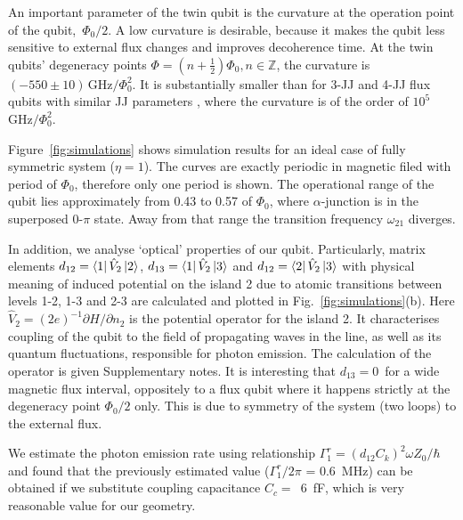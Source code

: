 \documentclass[%
reprint,
superscriptaddress,
bibnotes,
amsmath,
amssymb,
aps,
showkeys,
prb,
]{revtex4-1}
\newcommand{\iket}[1]{\ensuremath{\Ket{#1}}}
\newcommand{\ibra}[1]{\ensuremath{\Bra{#1}}}
\newcommand{\iabs}[1]{\ensuremath{\left|#1\right|}}
\begin{document}
{An  important  parameter of the twin qubit is  the curvature at  the operation  point  of the  qubit, \,$\Phi_{0}/2$.  A  low curvature  is
desirable, because it  makes the  qubit less  sensitive to  external flux  changes and
improves  decoherence  time.   At   the  twin  qubits'  degeneracy  points
$      \Phi     =      (n+\frac{1}{2})\Phi_0,     n\in\mathbb{Z}      $,     the      curvature     is
$   (-550\pm10)\,\text{GHz}/\Phi_0^2  $.    It is substantially smaller than for 3-JJ and 4-JJ flux qubits with
similar JJ parameters \cite{Astafiev_2010, Stern_2014, Gustavsson_2012}, where the curvature is of the order of
$ 10^5$ $  \text{GHz}/\Phi_0^2$.

Figure~\ref{fig:simulations} shows simulation results for an ideal case of fully symmetric system ($\eta=1$). The curves are exactly periodic in magnetic filed with period of $\Phi_0$, therefore only one period is shown. The operational range of the qubit lies approximately from 0.43 to 0.57 of $\Phi_0$, where $\alpha$-junction is in the superposed 0-$\pi$ state\cite{Shulga_2018}. Away from that range the transition frequency $\omega_{21}$ diverges.


In addition, we analyse `optical' properties of our qubit.
Particularly, matrix elements $d_{12} = \ibra{1}\hat{V}_2\iket{2}$, $d_{13} = \ibra{1}\hat{V}_2\iket{3}$ and $d_{12} = \ibra{2}\hat{V}_2\iket{3}$ with physical meaning of induced potential on the island 2 due to atomic transitions between levels 1-2, 1-3 and 2-3 are calculated and plotted in Fig.~\ref{fig:simulations}(b). Here $\hat{V}_2 = (2e)^{-1}\partial H/\partial n_2$ is the potential operator for the island 2. It characterises coupling of the qubit to the field of propagating waves in the line, as well as its quantum fluctuations, responsible for photon emission. The calculation of the operator is given Supplementary notes.
It is interesting that $d_{13} = 0$\, for a wide magnetic flux interval, oppositely to a flux qubit where it happens strictly at the degeneracy point $\Phi_0/2$ only. This is due to symmetry of the system (two loops) to the external flux.

We estimate the photon emission rate using relationship\cite{Astafiev_2010,Peng_SPS} $\Gamma_1^r = (d_{12} C_k)^2 \omega Z_0/\hbar$ and found that the previously estimated value ($\Gamma_1^r/2\pi$ = 0.6~MHz) can be obtained if we substitute coupling capacitance $C_c =$~6~fF, which is very reasonable value for our geometry.

}
\end{document}
